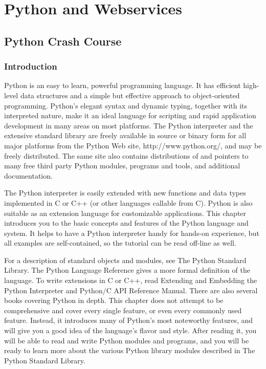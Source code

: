 \documentclass[12pt,a4paper,final,twoside,onecolumn,titlepage]{book}
\begin{document}


\chapter{Python and Webservices}
\section{Python Crash Course}
\subsection{Introduction}
Python is an easy to learn, powerful programming language. It has efficient high-level data structures and a simple but effective approach to object-oriented programming. Python’s elegant syntax and dynamic typing, together with its interpreted nature, make it an ideal language for scripting and rapid application development in many areas on most platforms. The Python interpreter and the extensive standard library are freely available in source or binary form for all major platforms from the Python Web site, http://www.python.org/, and may be freely distributed. The same site also contains distributions of and pointers to many free third party Python modules, programs and tools, and additional documentation.

The Python interpreter is easily extended with new functions and data types implemented in C or C++ (or other languages callable from C). Python is also suitable as an extension language for customizable applications. This chapter introduces you to the basic concepts and features of the Python language and system. It helps to have a Python interpreter handy for hands-on experience, but all examples are self-contained, so the tutorial can be read off-line as well.

For a description of standard objects and modules, see The Python Standard Library. The Python Language Reference gives a more formal definition of the language. To write extensions in C or C++, read Extending and Embedding the Python Interpreter and Python/C API Reference Manual. There are also several books covering Python in depth. This chapter does not attempt to be comprehensive and cover every single feature, or even every commonly used feature. Instead, it introduces many of Python’s most noteworthy features, and will give you a good idea of the language’s flavor and style. After reading it, you will be able to read and write Python modules and programs, and you will be ready to learn more about the various Python library modules described in The Python Standard Library.
\end{document}
